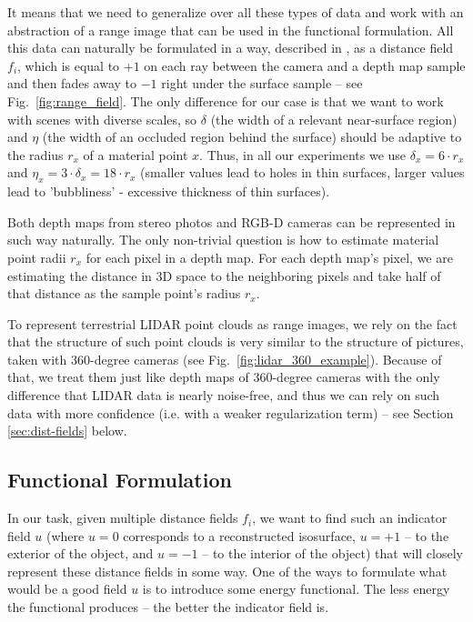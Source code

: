 \documentclass[10pt,twocolumn,letterpaper]{article}
\begin{document}
It means that we need to generalize over all these types of data and work with an abstraction of a range image that can be used in the functional formulation.
All this data can naturally be formulated in a way, described in \cite{zach2007globally},
as a distance field $f_i$, which is equal to $+1$ on each ray between the camera and a depth map sample and then fades away to $-1$ right under the surface sample -- see Fig.~\ref{fig:range_field}.
The only difference for our case is that we want to work with scenes with diverse scales, so $\delta$ (the width of a relevant near-surface region) and $\eta$ (the width of an occluded region behind the surface) should be adaptive to the radius $r_x$ of a material point $x$.
Thus, in all our experiments we use $\delta_x=6 \cdot r_x$ and $\eta_x=3 \cdot \delta_x=18 \cdot r_x$ (smaller values lead to holes in thin surfaces, larger values lead to 'bubbliness' - excessive thickness of thin surfaces).

Both depth maps from stereo photos and RGB-D cameras can be represented in such way naturally.
The only non-trivial question is how to estimate material point radii $r_x$ for each pixel in a depth map.
For each depth map's pixel, we are estimating the distance in 3D space to the neighboring pixels and take half of that distance as the sample point's radius $r_x$.

To represent terrestrial LIDAR point clouds as range images, we rely on the fact that the structure of such point clouds is very similar to the structure of pictures, taken with 360-degree cameras (see Fig.~\ref{fig:lidar_360_example}).
Because of that, we treat them just like depth maps of 360-degree cameras with the only difference that LIDAR data is nearly noise-free, and
thus we can rely on such data with more confidence (i.e. with a weaker regularization term) -- see Section \ref{sec:dist-fields} below.

\subsection{Functional Formulation}

In our task, given multiple distance fields $f_i$, we want to find such an indicator field $u$
(where $u=0$ corresponds to a reconstructed isosurface, $u=+1$ -- to the exterior of the object, and  $u=-1$ -- to the interior of the object)
that will closely represent these distance fields in some way.
One of the ways to formulate what would be a good field $u$ is to introduce some energy functional. The less energy the functional produces -- the better the indicator field is.
\end{document}
